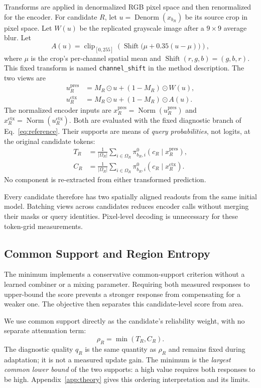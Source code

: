 \documentclass[letterpaper]{article}
\begin{document}
Transforms are applied in denormalized RGB pixel space and then renormalized for the encoder. For candidate $R$, let $u=\operatorname{Denorm}(x_{b_R})$ be its source crop in pixel space. Let $W(u)$ be the replicated grayscale image after a $9\times9$ average blur. Let
\begin{equation}
A(u)=\operatorname{clip}_{[0,255]}
\left(\operatorname{Shift}\bigl(\mu+0.35(u-\mu)\bigr)\right),
\end{equation}
where $\mu$ is the crop's per-channel spatial mean and $\operatorname{Shift}(r,g,b)=(g,b,r)$. This fixed transform is named \texttt{channel\_shift} in the method description. The two views are
\begin{align}
u_R^{\mathrm{pres}}&=M_R\odot u+(1-M_R)\odot W(u),\\
u_R^{\mathrm{ctx}}&=M_R\odot u+(1-M_R)\odot A(u).
\end{align}
The normalized encoder inputs are $x_R^{\mathrm{pres}}=\operatorname{Norm}(u_R^{\mathrm{pres}})$ and $x_R^{\mathrm{ctx}}=\operatorname{Norm}(u_R^{\mathrm{ctx}})$. Both are evaluated with the fixed diagnostic branch of Eq.~\ref{eq:reference}. Their supports are means of \emph{query probabilities}, not logits, at the original candidate tokens:
\begin{align}
T_R&=\frac{1}{|\Omega_R|}\sum_{i\in\Omega_R}
\pi^0_{b_R,i}(c_R\mid x_R^{\mathrm{pres}}),\\
C_R&=\frac{1}{|\Omega_R|}\sum_{i\in\Omega_R}
\pi^0_{b_R,i}(c_R\mid x_R^{\mathrm{ctx}}).
\end{align}
No component is re-extracted from either transformed prediction.

Every candidate therefore has two spatially aligned readouts from the same initial model. Batching views across candidates reduces encoder calls without merging their masks or query identities. Pixel-level decoding is unnecessary for these token-grid measurements.

\subsection{Common Support and Region Entropy}
The minimum implements a conservative common-support criterion without a learned combiner or a mixing parameter. Requiring both measured responses to upper-bound the score prevents a stronger response from compensating for a weaker one. The objective then separates this candidate-level score from area.

We use common support directly as the candidate's reliability weight, with no separate attenuation term:
\begin{equation}
\rho_R=\min(T_R,C_R).
\label{eq:minimum}
\end{equation}
The diagnostic quality $q_R$ is the same quantity as $\rho_R$ and remains fixed during adaptation; it is not a measured update gain. The minimum is the \emph{largest common lower bound} of the two supports: a high value requires both responses to be high. Appendix~\ref{app:theory} gives this ordering interpretation and its limits.
\end{document}
